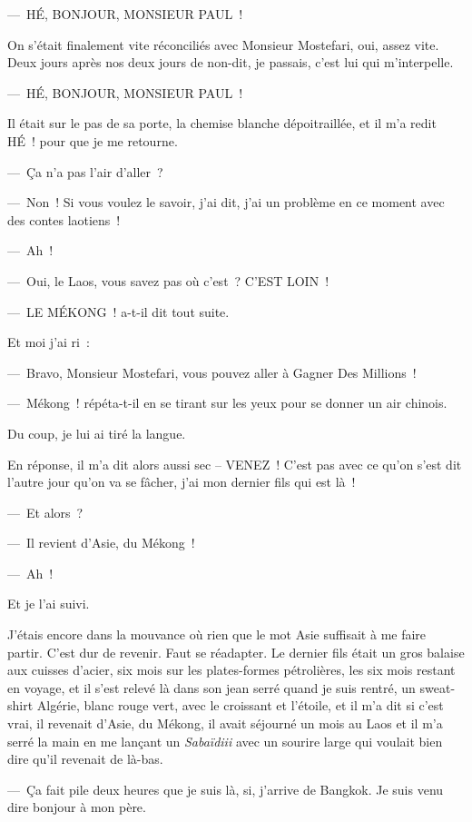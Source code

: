 \documentclass[twoside]{book} %
\begin{document}
— HÉ, BONJOUR, MONSIEUR PAUL !\par
On s’était finalement vite réconciliés avec Monsieur Mostefari, oui, assez vite. Deux jours après nos deux jours de non-dit, je passais, c’est lui qui m’interpelle.\par
— HÉ, BONJOUR, MONSIEUR PAUL !\par
Il était sur le pas de sa porte, la chemise blanche dépoitraillée, et il m’a redit HÉ ! pour que je me retourne.\par
— Ça n’a pas l’air d’aller ?\par
— Non ! Si vous voulez le savoir, j’ai dit, j’ai un problème en ce moment avec des contes laotiens !\par
— Ah !\par
— Oui, le Laos, vous savez pas où c’est ? C’EST LOIN !\par
— LE MÉKONG ! a-t-il dit tout suite.\par
Et moi j’ai ri :\par
— Bravo, Monsieur Mostefari, vous pouvez aller à Gagner Des Millions !\par
— Mékong ! répéta-t-il en se tirant sur les yeux pour se donner un air chinois.\par
Du coup, je lui ai tiré la langue.\par
En réponse, il m’a dit alors aussi sec – VENEZ ! C’est pas avec ce qu’on s’est dit l’autre jour qu’on va se fâcher, j’ai mon dernier fils qui est là !\par
— Et alors ?\par
— Il revient d’Asie, du Mékong !\par
— Ah !\par
Et je l’ai suivi.\par
J’étais encore dans la mouvance où rien que le mot Asie suffisait à me faire partir. C’est dur de revenir. Faut se réadapter. Le dernier fils était un gros balaise aux cuisses d’acier, six mois sur les plates-formes pétrolières, les six mois restant en voyage, et il s’est relevé là dans son jean serré quand je suis rentré, un sweat-shirt Algérie, blanc rouge vert, avec le croissant et l’étoile, et il m’a dit si c’est vrai, il revenait d’Asie, du Mékong, il avait séjourné un mois au Laos et il m’a serré la main en me lançant un \emph{Sabaïdiii} avec un sourire large qui voulait bien dire qu’il revenait de là-bas.\par
— Ça fait pile deux heures que je suis là, si, j’arrive de Bangkok. Je suis venu dire bonjour à mon père.\par
\end{document}
